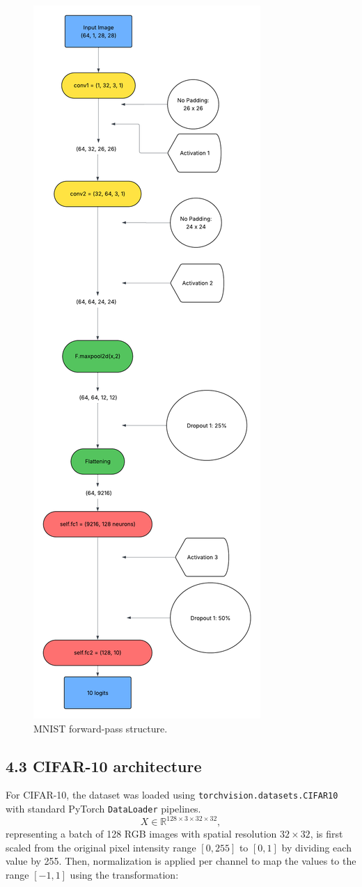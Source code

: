 \documentclass{article}
\begin{document}
\begin{figure}[H]
    \centering
    \includegraphics[width=0.4\linewidth]{mnist_forwardpass.png}
    \caption{MNIST forward-pass structure.}
    \label{fig:mnist-pass-shift}
\end{figure}
















\vspace{7pt}

\subsection*{4.3 CIFAR-10 architecture}

For CIFAR-10, the dataset was loaded using \texttt{torchvision.datasets.CIFAR10} with standard PyTorch \texttt{DataLoader} pipelines.
\[
X \in \mathbb{R}^{128 \times 3 \times 32 \times 32},
\]
representing a batch of 128 RGB images with spatial resolution \(32 \times 32\), is first scaled from the original pixel intensity range \([0, 255]\) to \([0, 1]\) by dividing each value by 255. Then, normalization is applied per channel to map the values to the range \([-1, 1]\) using the transformation:
\end{document}

